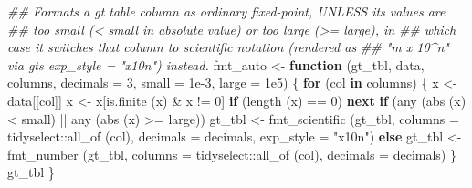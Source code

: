 \documentclass[
  letterpaper,
  DIV=11,
  numbers=noendperiod]{scrreprt}
\newenvironment{Shaded}{\begin{snugshade}}{\end{snugshade}}
\newcommand{\AttributeTok}[1]{\textcolor[rgb]{0.40,0.45,0.13}{#1}}
\newcommand{\ControlFlowTok}[1]{\textcolor[rgb]{0.00,0.23,0.31}{\textbf{#1}}}
\newcommand{\DecValTok}[1]{\textcolor[rgb]{0.68,0.00,0.00}{#1}}
\newcommand{\DocumentationTok}[1]{\textcolor[rgb]{0.37,0.37,0.37}{\textit{#1}}}
\newcommand{\FloatTok}[1]{\textcolor[rgb]{0.68,0.00,0.00}{#1}}
\newcommand{\FunctionTok}[1]{\textcolor[rgb]{0.28,0.35,0.67}{#1}}
\newcommand{\NormalTok}[1]{\textcolor[rgb]{0.00,0.23,0.31}{#1}}
\newcommand{\OtherTok}[1]{\textcolor[rgb]{0.00,0.23,0.31}{#1}}
\newcommand{\SpecialCharTok}[1]{\textcolor[rgb]{0.37,0.37,0.37}{#1}}
\newcommand{\StringTok}[1]{\textcolor[rgb]{0.13,0.47,0.30}{#1}}
\renewcommand{\[}{\begin{equation}}
\renewcommand{\]}{\end{equation}}
\begin{document}
\begin{Shaded}
\begin{Highlighting}[]
\DocumentationTok{\#\# Formats a gt table column as ordinary fixed{-}point, UNLESS its values are}
\DocumentationTok{\#\# too small (\textless{} \textasciigrave{}small\textasciigrave{} in absolute value) or too large (\textgreater{}= \textasciigrave{}large\textasciigrave{}), in}
\DocumentationTok{\#\# which case it switches that column to scientific notation (rendered as}
\DocumentationTok{\#\# "m x 10\^{}n" via gt\textquotesingle{}s exp\_style = "x10n") instead.}
\NormalTok{fmt\_auto }\OtherTok{\textless{}{-}} \ControlFlowTok{function}\NormalTok{ (gt\_tbl, data, columns, }\AttributeTok{decimals =} \DecValTok{3}\NormalTok{, }\AttributeTok{small =} \FloatTok{1e{-}3}\NormalTok{, }\AttributeTok{large =} \FloatTok{1e5}\NormalTok{)}
\NormalTok{\{}
    \ControlFlowTok{for}\NormalTok{ (col }\ControlFlowTok{in}\NormalTok{ columns)}
\NormalTok{    \{}
\NormalTok{        x }\OtherTok{\textless{}{-}}\NormalTok{ data[[col]]}
\NormalTok{        x }\OtherTok{\textless{}{-}}\NormalTok{ x[}\FunctionTok{is.finite}\NormalTok{ (x) }\SpecialCharTok{\&}\NormalTok{ x }\SpecialCharTok{!=} \DecValTok{0}\NormalTok{]}
        \ControlFlowTok{if}\NormalTok{ (}\FunctionTok{length}\NormalTok{ (x) }\SpecialCharTok{==} \DecValTok{0}\NormalTok{) }\ControlFlowTok{next}
        \ControlFlowTok{if}\NormalTok{ (}\FunctionTok{any}\NormalTok{ (}\FunctionTok{abs}\NormalTok{ (x) }\SpecialCharTok{\textless{}}\NormalTok{ small) }\SpecialCharTok{||} \FunctionTok{any}\NormalTok{ (}\FunctionTok{abs}\NormalTok{ (x) }\SpecialCharTok{\textgreater{}=}\NormalTok{ large))}
\NormalTok{            gt\_tbl }\OtherTok{\textless{}{-}} \FunctionTok{fmt\_scientific}\NormalTok{ (gt\_tbl, }\AttributeTok{columns =}\NormalTok{ tidyselect}\SpecialCharTok{::}\FunctionTok{all\_of}\NormalTok{ (col), }\AttributeTok{decimals =}\NormalTok{ decimals, }\AttributeTok{exp\_style =} \StringTok{"x10n"}\NormalTok{)}
        \ControlFlowTok{else}
\NormalTok{            gt\_tbl }\OtherTok{\textless{}{-}} \FunctionTok{fmt\_number}\NormalTok{ (gt\_tbl, }\AttributeTok{columns =}\NormalTok{ tidyselect}\SpecialCharTok{::}\FunctionTok{all\_of}\NormalTok{ (col), }\AttributeTok{decimals =}\NormalTok{ decimals)}
\NormalTok{    \}}
\NormalTok{    gt\_tbl}
\NormalTok{\}}


\end{Highlighting}
\end{Shaded}
\end{document}
